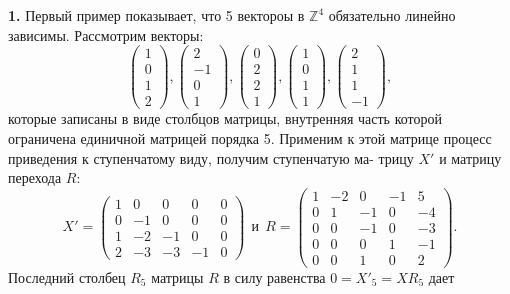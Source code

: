 	{\bf1.} Первый пример показывает, что 5 вектороы в $\mathbb Z^4$ обязательно\linebreak
	линейно зависимы. Рассмотрим векторы:
	$$\begin{pmatrix} 1 \\ 0 \\ 1 \\ 2 \end{pmatrix}, \begin{pmatrix} 2 \\ -1 \\ 0 \\ 1 \end{pmatrix}, \begin{pmatrix} 0 \\ 2 \\ 2 \\ 1 \end{pmatrix}, \begin{pmatrix} 1 \\ 0 \\ 1 \\ 1 \end{pmatrix}, \begin{pmatrix} 2 \\ 1 \\ 1 \\ -1 \end{pmatrix},$$
	которые записаны в виде столбцов матрицы, внутренняя часть которой\linebreak
	ограничена единичной матрицей порядка 5. Применим к этой матрице\linebreak
	процесс приведения к ступенчатому виду, получим ступенчатую ма-\linebreak
	трицу $X'$ и матрицу перехода $R$:
	$$X' = \begin{pmatrix} 1 & 0 & 0 & 0 & 0\\ 0 & -1 & 0 & 0 & 0 \\ 1 & -2 & -1 & 0 & 0 \\ 2 & -3 & -3 & -1 & 0 \end{pmatrix} \ \ \text{и} \ \ R = \begin{pmatrix} 1 & -2 & 0 & -1 & 5\\ 0 & 1 & -1 & 0 & -4 \\ 0 & 0 & -1 & 0 & -3 \\ 0 & 0 & 0 & 1 & -1 \\ 0 & 0 & 1 & 0 & 2 \end{pmatrix}.$$
	Последний столбец $R_5$ матрицы $R$ в силу равенства $0 = X'_5 = XR_5$ дает\linebreak
